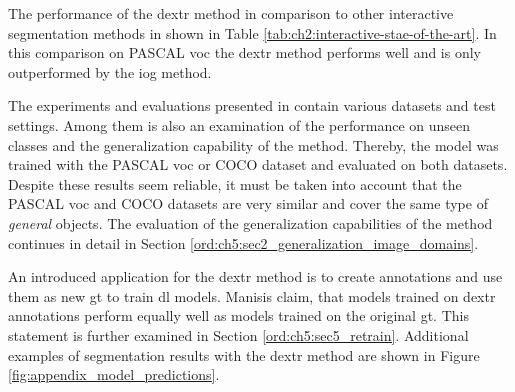 The performance of the \gls{dextr} method in comparison to other interactive segmentation methods in shown in Table \ref{tab:ch2:interactive-stae-of-the-art}.
In this comparison on PASCAL \gls{voc} the \gls{dextr} method performs well and is only outperformed by the \gls{iog} method.

The experiments and evaluations presented in \cite{Man18-DEXTR} contain various datasets and test settings.
Among them is also an examination of the performance on unseen classes and the generalization capability of the method.
Thereby, the model was trained with the PASCAL \gls{voc} or COCO dataset and evaluated on both datasets.
Despite these results seem reliable, it must be taken into account that the PASCAL \gls{voc} and COCO datasets are very similar and cover the same type of \textit{general} objects.
The evaluation of the generalization capabilities of the method continues in detail in Section \ref{ord:ch5:sec2_generalization_image_domains}.

An introduced application for the \gls{dextr} method is to create annotations and use them as new \gls{gt} to train \gls{dl} models.
Manisis \etal claim, that models trained on \gls{dextr} annotations perform equally well as models trained on the original \gls{gt}\cite{Man18-DEXTR}.
This statement is further examined in Section \ref{ord:ch5:sec5_retrain}.
Additional examples of segmentation results with the \gls{dextr} method are shown in Figure \ref{fig:appendix_model_predictions}.